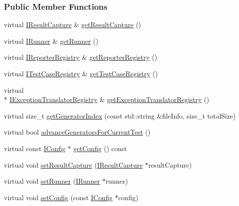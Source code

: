 \subsubsection*{Public Member Functions}
\begin{DoxyCompactItemize}
\item 
virtual \hyperlink{structCatch_1_1IResultCapture}{I\-Result\-Capture} \& \hyperlink{classCatch_1_1Context_ae28e8862c120382a5747ffc36611271b}{get\-Result\-Capture} ()
\item 
virtual \hyperlink{structCatch_1_1IRunner}{I\-Runner} \& \hyperlink{classCatch_1_1Context_aa28c1fa65249a6b344d8574c3f345525}{get\-Runner} ()
\item 
virtual \hyperlink{structCatch_1_1IReporterRegistry}{I\-Reporter\-Registry} \& \hyperlink{classCatch_1_1Context_aad092bba66a990c412eb5137e8a8d1fd}{get\-Reporter\-Registry} ()
\item 
virtual \hyperlink{structCatch_1_1ITestCaseRegistry}{I\-Test\-Case\-Registry} \& \hyperlink{classCatch_1_1Context_a4355723154f927cacb75f5894f599627}{get\-Test\-Case\-Registry} ()
\item 
virtual \\*
\hyperlink{structCatch_1_1IExceptionTranslatorRegistry}{I\-Exception\-Translator\-Registry} \& \hyperlink{classCatch_1_1Context_a8e3ce31c44d5b3c706a878dcdd77d7e9}{get\-Exception\-Translator\-Registry} ()
\item 
virtual size\-\_\-t \hyperlink{classCatch_1_1Context_a06474443026c33532fdfb2ea1848eb31}{get\-Generator\-Index} (const std\-::string \&file\-Info, size\-\_\-t total\-Size)
\item 
virtual bool \hyperlink{classCatch_1_1Context_aa4c8d900c7168191636bf54ae5c1d501}{advance\-Generators\-For\-Current\-Test} ()
\item 
virtual const \hyperlink{structCatch_1_1IConfig}{I\-Config} $\ast$ \hyperlink{classCatch_1_1Context_a352ac7605c53582bf278105396ce8f74}{get\-Config} () const 
\item 
virtual void \hyperlink{classCatch_1_1Context_acd5a98f515e43085a2d32e6c48d582b0}{set\-Result\-Capture} (\hyperlink{structCatch_1_1IResultCapture}{I\-Result\-Capture} $\ast$result\-Capture)
\item 
virtual void \hyperlink{classCatch_1_1Context_a9be76af925623d87d5692a08bf58abca}{set\-Runner} (\hyperlink{structCatch_1_1IRunner}{I\-Runner} $\ast$runner)
\item 
virtual void \hyperlink{classCatch_1_1Context_a95379b3aeaca34fb2c9a7a4424cab98c}{set\-Config} (const \hyperlink{structCatch_1_1IConfig}{I\-Config} $\ast$config)
\end{DoxyCompactItemize}
